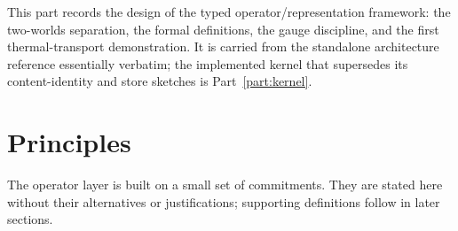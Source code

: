 \documentclass[11pt,a4paper]{article}
\begin{document}
\noindent This part records the design of the typed operator/representation
framework: the two-worlds separation, the formal definitions, the gauge
discipline, and the first thermal-transport demonstration. It is carried from
the standalone architecture reference essentially verbatim; the implemented
kernel that supersedes its content-identity and store sketches is
Part~\ref{part:kernel}.

\section{Principles}
\label{sec:principles}

The operator layer is built on a small set of commitments. They are stated here without
their alternatives or justifications; supporting definitions follow in later sections.
\end{document}
